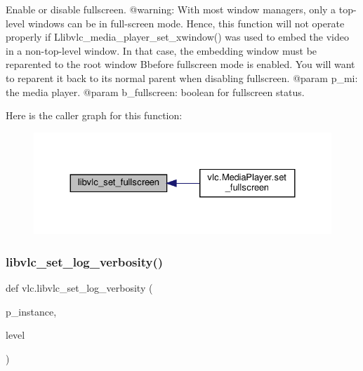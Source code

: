 \begin{DoxyVerb}Enable or disable fullscreen.
@warning: With most window managers, only a top-level windows can be in
full-screen mode. Hence, this function will not operate properly if
L{libvlc_media_player_set_xwindow}() was used to embed the video in a
non-top-level window. In that case, the embedding window must be reparented
to the root window B{before} fullscreen mode is enabled. You will want
to reparent it back to its normal parent when disabling fullscreen.
@param p_mi: the media player.
@param b_fullscreen: boolean for fullscreen status.
\end{DoxyVerb}
 Here is the caller graph for this function\+:
\nopagebreak
\begin{figure}[H]
\begin{center}
\leavevmode
\includegraphics[width=324pt]{namespacevlc_a22a30fc3b5a348e7363b5ad4dba42564_icgraph}
\end{center}
\end{figure}
\mbox{\label{namespacevlc_aca5f2f88af6fc65ce68b4a68a0e1cf5a}} 
\subsubsection{\texorpdfstring{libvlc\+\_\+set\+\_\+log\+\_\+verbosity()}{libvlc\_set\_log\_verbosity()}}
{\footnotesize\ttfamily def vlc.\+libvlc\+\_\+set\+\_\+log\+\_\+verbosity (\begin{DoxyParamCaption}\item[{}]{p\+\_\+instance,  }\item[{}]{level }\end{DoxyParamCaption})}


